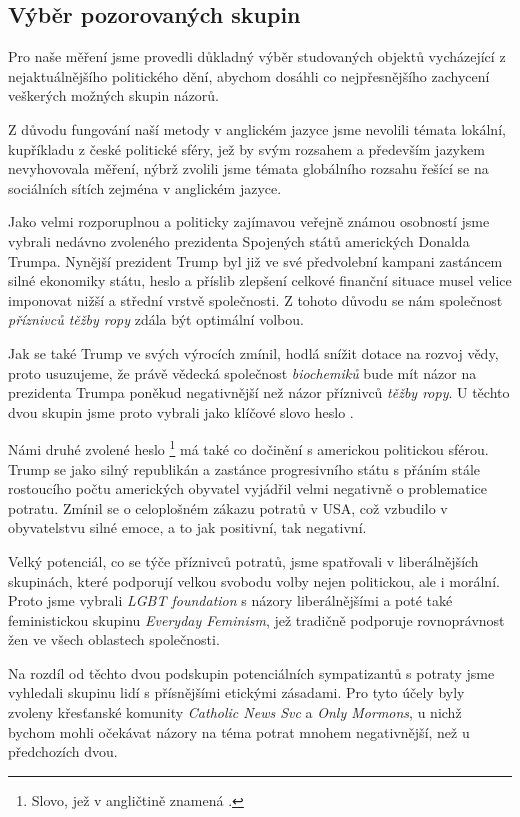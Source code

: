 \documentclass[12pt, a4paper]{article}
\numberwithin{equation}{section} 	%
\begin{document}
\subsection{Výběr pozorovaných skupin}
\noindent Pro naše měření jsme provedli důkladný výběr studovaných objektů vycházející z nejaktuálnějšího politického dění, abychom dosáhli co nejpřesnějšího zachycení veškerých možných skupin názorů.

Z důvodu fungování naší metody v anglickém jazyce jsme nevolili témata lokální, kupříkladu z české politické sféry, jež by svým rozsahem a především jazykem nevyhovovala měření, nýbrž zvolili jsme témata globálního rozsahu řešící se na sociálních sítích zejména v anglickém jazyce.

Jako velmi rozporuplnou a politicky zajímavou veřejně známou osobností jsme vybrali nedávno zvoleného prezidenta Spojených států amerických Donalda Trumpa. Nynější prezident Trump byl již ve své předvolební kampani zastáncem silné ekonomiky státu, heslo  a příslib zlepšení celkové finanční situace musel velice imponovat nižší a střední vrstvě společnosti. Z tohoto důvodu se nám společnost \textit{příznivců těžby ropy} zdála být optimální volbou.

Jak se také Trump ve svých výrocích zmínil, hodlá snížit dotace na rozvoj vědy, proto usuzujeme, že právě vědecká společnost \textit{biochemiků} bude mít názor na prezidenta Trumpa poněkud negativnější než názor příznivců \textit{těžby ropy}. U těchto dvou skupin jsme proto vybrali jako klíčové slovo heslo \textit{}.

Námi druhé zvolené heslo \textit{}\footnote{Slovo, jež v angličtině znamená \textit{}.} má také co dočinění s americkou politickou sférou. Trump se jako silný republikán a zastánce progresivního státu s přáním stále rostoucího počtu amerických obyvatel vyjádřil velmi negativně o problematice potratu. Zmínil se o celoplošném zákazu potratů v USA, což vzbudilo v obyvatelstvu silné emoce, a to jak positivní, tak negativní.

Velký potenciál, co se týče příznivců potratů, jsme spatřovali v liberálnějších skupinách, které podporují velkou svobodu volby nejen politickou, ale i morální. Proto jsme vybrali \textit{LGBT foundation} s názory liberálnějšími a poté také feministickou skupinu \textit{Everyday Feminism}, jež tradičně podporuje rovnoprávnost žen ve všech oblastech společnosti.

Na rozdíl od těchto dvou podskupin potenciálních sympatizantů s potraty jsme vyhledali skupinu lidí s přísnějšími etickými zásadami. Pro tyto účely byly zvoleny křesťanské komunity \textit{Catholic News Svc} a \textit{Only Mormons}, u nichž bychom mohli očekávat názory na téma potrat mnohem negativnější, než u předchozích dvou.
\end{document}

